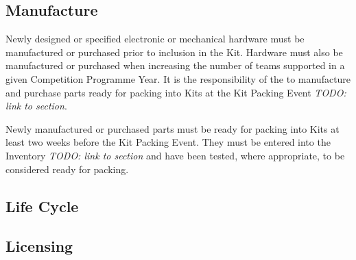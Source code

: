 \begin{draft}
\subsection{Manufacture}

Newly designed or specified electronic or mechanical hardware must be manufactured or purchased prior to inclusion in the Kit. Hardware must also be manufactured or purchased when increasing the number of teams supported in a given Competition Programme Year. It is the responsibility of the  to manufacture and purchase parts ready for packing into Kits at the Kit Packing Event \emph{TODO: link to section}.

Newly manufactured or purchased parts must be ready for packing into Kits at least two weeks before the Kit Packing Event. They must be entered into the Inventory \emph{TODO: link to section} and have been tested, where appropriate, to be considered ready for packing.

\subsection{Life Cycle}

\subsection{Licensing}


\end{draft}
